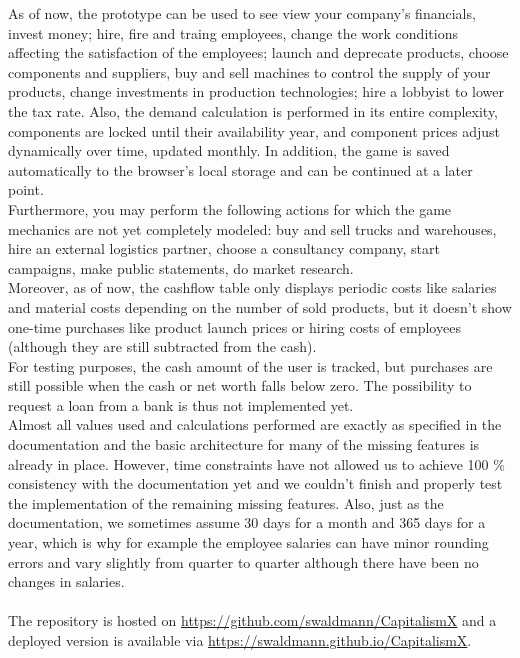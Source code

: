   As of now, the prototype can be used to see view your company's financials, invest money; hire, fire and traing employees, change the work conditions affecting the satisfaction of the employees; launch and deprecate products, choose components and suppliers, buy and sell machines to control the supply of your products, change investments in production technologies; hire a lobbyist to lower the tax rate. Also, the demand calculation is performed in its entire complexity, components are locked until their availability year, and component prices adjust dynamically over time, updated monthly. In addition, the game is saved automatically to the browser's local storage and can be continued at a later point.\\
  
  Furthermore, you may perform the following actions for which the game mechanics are not yet completely modeled: buy and sell trucks and warehouses, hire an external logistics partner, choose a consultancy company, start campaigns, make public statements, do market research.\\
  
  Moreover, as of now, the cashflow table only displays periodic costs like salaries and material costs depending on the number of sold products, but it doesn't show one-time purchases like product launch prices or hiring costs of employees (although they are still subtracted from the cash).\\
  
  For testing purposes, the cash amount of the user is tracked, but purchases are still possible when the cash or net worth falls below zero. The possibility to request a loan from a bank is thus not implemented yet.\\
 
Almost all values used and calculations performed are exactly as specified in the documentation and the basic architecture for many of the missing features is already in place. However, time constraints have not allowed us to achieve 100 \% consistency with the documentation yet and we couldn't finish and properly test the implementation of the remaining missing features. Also, just as the documentation, we sometimes assume 30 days for a month and 365 days for a year, which is why for example the employee salaries can have minor rounding errors and vary slightly from quarter to quarter although there have been no changes in salaries.\\\\
The repository is hosted on \href{https://github.com/swaldmann/CapitalismX}{https://github.com/swaldmann/CapitalismX} and a deployed version is available via \href{https://swaldmann.github.io/CapitalismX}{https://swaldmann.github.io/CapitalismX}.